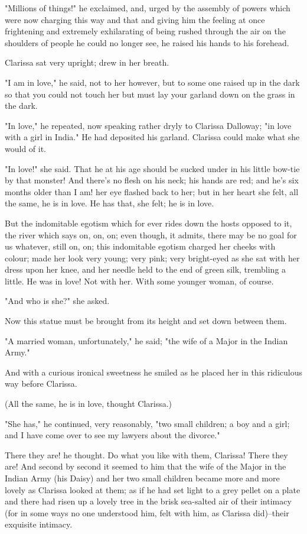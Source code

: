 \documentclass[lang=cn,10pt]{elegantbook}
\begin{document}
"Millions of things!" he exclaimed, and, urged by the assembly of
powers which were now charging this way and that and giving him the
feeling at once frightening and extremely exhilarating of being
rushed through the air on the shoulders of people he could no
longer see, he raised his hands to his forehead.

Clarissa sat very upright; drew in her breath.

"I am in love," he said, not to her however, but to some one raised
up in the dark so that you could not touch her but must lay your
garland down on the grass in the dark.

"In love," he repeated, now speaking rather dryly to Clarissa
Dalloway; "in love with a girl in India."  He had deposited his
garland.  Clarissa could make what she would of it.

"In love!" she said.  That he at his age should be sucked under in
his little bow-tie by that monster!  And there's no flesh on his
neck; his hands are red; and he's six months older than I am! her
eye flashed back to her; but in her heart she felt, all the same,
he is in love.  He has that, she felt; he is in love.

But the indomitable egotism which for ever rides down the hosts
opposed to it, the river which says on, on, on; even though, it
admits, there may be no goal for us whatever, still on, on; this
indomitable egotism charged her cheeks with colour; made her look
very young; very pink; very bright-eyed as she sat with her dress
upon her knee, and her needle held to the end of green silk,
trembling a little.  He was in love!  Not with her.  With some
younger woman, of course.

"And who is she?" she asked.

Now this statue must be brought from its height and set down
between them.

"A married woman, unfortunately," he said; "the wife of a Major in
the Indian Army."

And with a curious ironical sweetness he smiled as he placed her in
this ridiculous way before Clarissa.

(All the same, he is in love, thought Clarissa.)

"She has," he continued, very reasonably, "two small children; a
boy and a girl; and I have come over to see my lawyers about the
divorce."

There they are! he thought.  Do what you like with them, Clarissa!
There they are!  And second by second it seemed to him that the
wife of the Major in the Indian Army (his Daisy) and her two small
children became more and more lovely as Clarissa looked at them; as
if he had set light to a grey pellet on a plate and there had risen
up a lovely tree in the brisk sea-salted air of their intimacy (for
in some ways no one understood him, felt with him, as Clarissa
did)--their exquisite intimacy.
\end{document}
